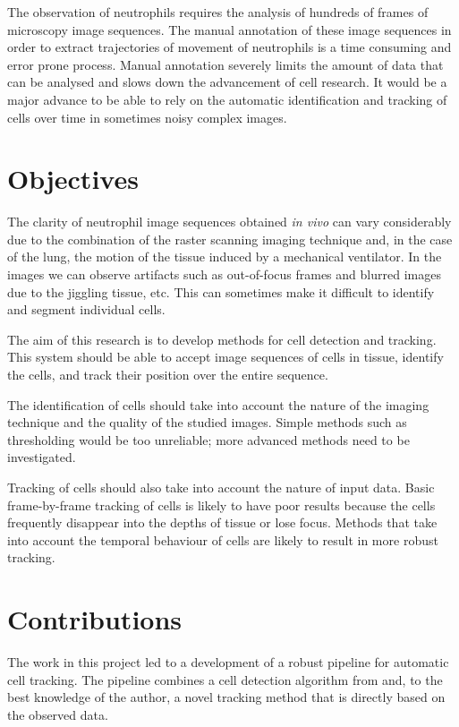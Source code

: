 		The observation of neutrophils requires the analysis of hundreds of frames of microscopy image sequences. The manual annotation of these image sequences in order to extract trajectories of movement of neutrophils is a time consuming and error prone process. Manual annotation severely limits the amount of data that can be analysed and slows down the advancement of cell research. It would be a major advance to be able to rely on the automatic identification and tracking of cells over time in sometimes noisy complex images.
		
	\section{Objectives}
		
		The clarity of neutrophil image sequences obtained \textit{in vivo} can vary considerably due to the combination of the raster scanning imaging technique and, in the case of the lung, the motion of the tissue induced by a mechanical ventilator. In the images we can observe artifacts such as out-of-focus frames and blurred images due to the jiggling tissue, etc. This can sometimes make it difficult to identify and segment individual cells.
		
		The aim of this research is to develop methods for cell detection and tracking. This system should be able to accept image sequences of cells in tissue, identify the cells, and track their position over the entire sequence.
		
		The identification of cells should take into account the nature of the imaging technique and the quality of the studied images. Simple methods such as thresholding would be too unreliable; more advanced methods need to be investigated.
		
		Tracking of cells should also take into account the nature of input data. Basic frame-by-frame tracking of cells is likely to have poor results because the cells frequently disappear into the depths of tissue or lose focus. Methods that take into account the temporal behaviour of cells are likely to result in more robust tracking.
		
	\section{Contributions}
		
		The work in this project led to a development of a robust pipeline for automatic cell tracking. The pipeline combines a cell detection algorithm from \cite{arteta12} and, to the best knowledge of the author, a novel tracking method that is directly based on the observed data. 
		
